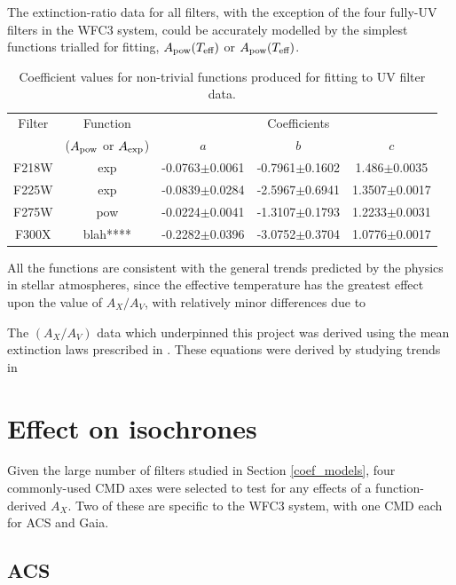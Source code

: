 \documentclass[12pt, a4paper]{report}
\begin{document}
The extinction-ratio data for all filters, with the exception of the four fully-UV filters in the WFC3 system, could be accurately modelled by the simplest functions trialled for fitting, $A_{\textnormal{pow}} (T_{\textnormal{eff}})$ or $A_{\textnormal{pow}} (T_{\textnormal{eff}})$.
\begin{table}
\begin{center}
\begin{tabular}{ccccc}
\hline

Filter &  Function & & Coefficients & \\
 & ($A_{\textnormal{pow}}$ or $A_{\textnormal{exp}}$) & $a$ & $b$ & $c$ \\
\hline
F218W & exp & -0.0763$\pm$0.0061 & -0.7961$\pm$0.1602 & 1.486$\pm$0.0035 \\
F225W & exp & -0.0839$\pm$0.0284 & -2.5967$\pm$0.6941 & 1.3507$\pm$0.0017 \\
F275W & pow & -0.0224$\pm$0.0041 & -1.3107$\pm$0.1793 & 1.2233$\pm$0.0031 \\
F300X & blah**** & -0.2282$\pm$0.0396 & -3.0752$\pm$0.3704 & 1.0776$\pm$0.0017 \\
\hline
\end{tabular}
\caption{Coefficient values for non-trivial functions produced for fitting to UV filter data.}
\label{UV_coeffs_table}
\end{center}
\end{table}

All the functions are consistent with the general trends predicted by the physics in stellar atmospheres, since the effective temperature has the greatest effect upon the value of $A_{X}/A_{V}$, with relatively minor differences due to 

The $(A_{X}/A_{V})$ data which underpinned this project was derived using the mean extinction laws prescribed in \citep{1989ApJ...345..245C}. These equations were derived by studying trends in 

\section{Effect on isochrones}
Given the large number of filters studied in Section \ref{coef_models}, four commonly-used CMD axes were selected to test for any effects of a function-derived $A_{X}$. Two of these are specific to the WFC3 system, with one CMD each for ACS and Gaia.
\subsection{ACS} \label{ACS_isoc}
\end{document}
